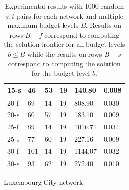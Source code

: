 \begin{table}
\begin{subtable}{.5\textwidth}
\begin{center}
\begin{tabular}{ | l | p{1cm} | p{1cm} | p{1cm} | p{1.2cm} | p{1.2cm} |}
	15-s & 46 & 53 & 19 & 140.80 & 0.008 \\ \hline
	20-f & 69 & 14 & 19 & 808.90 & 0.030 \\ 
	20-s & 60 & 57 & 19 & 183.10 & 0.009 \\ \hline
	25-f & 89 & 14 & 19 & 1016.71 & 0.034 \\ 
	25-s & 77 & 60 & 19 & 227.16 & 0.009 \\ \hline
	30-f & 101 & 14& 19 & 1144.07 & 0.032 \\ 
	30-s & 93 & 62 & 19 & 272.40 & 0.010 \\ \hline
\end{tabular}
\caption{Luxembourg City network}\label{tab:lu4k_results}
\end{center}
\end{subtable}
\caption{Experimental results with 1000 random $s,t$ pairs for each network and multiple maximum budget levels $B$. Results on rows $B-f$ correspond to computing the solution frontier for all budget levels $b\leq B$ while the results on rows $B-s$ correspond to computing the solution for the budget level $b$.}\label{tab:performance_results}
\end{table}

